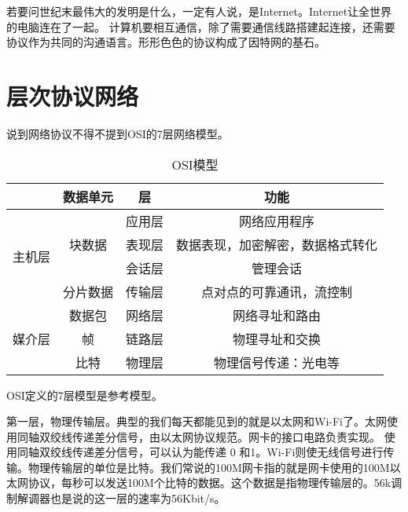 

若要问世纪末最伟大的发明是什么，一定有人说，是Internet。Internet让全世界的电脑连在了一起。
计算机要相互通信，除了需要通信线路搭建起连接，还需要协议作为共同的沟通语言。形形色色的协议构成了因特网的基石。

\section{层次协议网络}

说到网络协议不得不提到OSI的7层网络模型。

\begin{table}[h]
\begin{center}
\begin{tabular}{|c|c|c|c|}
\hline
& 数据单元 & 层 & 功能  \\ \hline %
\multirow{4}{*}{主机层}   &  \multirow{3}{*}{块数据} & 应用层  &  网络应用程序  \\ \cline{3-4}
&						 & 表现层 & 数据表现，加密解密，数据格式转化  \\ \cline{3-4}
&						 & 会话层 & 管理会话 \\ \cline{2-4}
& 分片数据  & 传输层 & 点对点的可靠通讯，流控制 \\ \hline
\multirow{3}{*}{媒介层}  & 数据包   & 网络层 & 网络寻址和路由 \\ \cline{2-4}
& 帧 & 链路层 & 物理寻址和交换 \\ \cline{2-4}
& 比特 & 物理层 & 物理信号传递：光电等 \\\hline
\end{tabular}
\caption{OSI模型}\label{tabel:ISOmodule}
\end{center}
\end{table}

OSI定义的7层模型是参考模型。

第一层，物理传输层。典型的我们每天都能见到的就是以太网和Wi-Fi了。太网使用同轴双绞线传递差分信号，由以太网协议规范。网卡的接口电路负责实现。
使用同轴双绞线传递差分信号，可以认为能传递 0 和1。Wi-Fi则使无线信号进行传输。物理传输层的单位是比特。我们常说的100M网卡指的就是网卡使用的100M以太网协议，每秒可以发送100M个比特的数据。这个数据是指物理传输层的。56k调制解调器也是说的这一层的速率为56Kbit/s。


